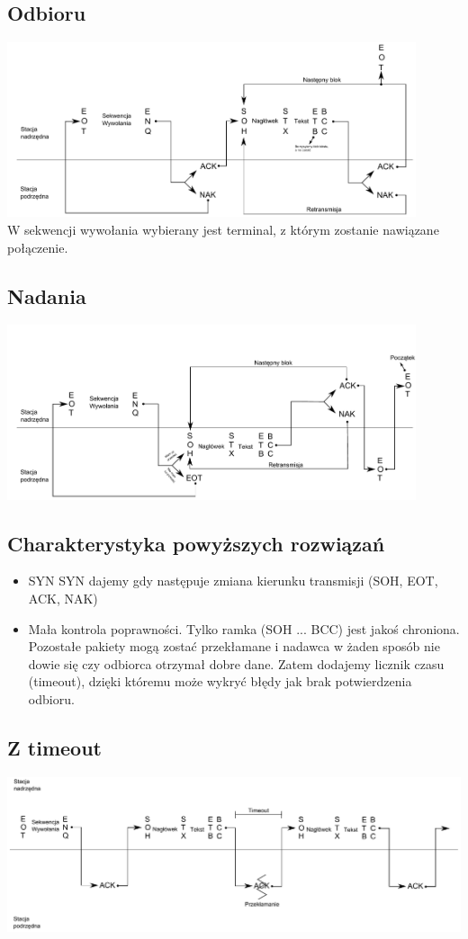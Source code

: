 		\subsection{Odbioru}
			\includegraphics[width=12cm]{./images/image06.pdf} \\
			W sekwencji wywołania wybierany jest terminal, z którym zostanie nawiązane połączenie.
		\subsection{Nadania}
			\includegraphics[width=12cm]{./images/image07.pdf}
		\subsection{Charakterystyka powyższych rozwiązań}
			\begin{itemize}
				\item SYN SYN dajemy gdy następuje zmiana kierunku transmisji (SOH, EOT, ACK, NAK)
				\item Mała kontrola poprawności. Tylko ramka (SOH ... BCC) jest jakoś chroniona. Pozostałe pakiety mogą zostać przekłamane i nadawca w żaden sposób nie dowie się czy odbiorca otrzymał dobre dane. Zatem dodajemy licznik czasu (timeout), dzięki któremu może wykryć błędy jak brak potwierdzenia odbioru.
			\end{itemize}
		\subsection{Z timeout}
			\includegraphics[width=14cm]{./images/image08.pdf}
